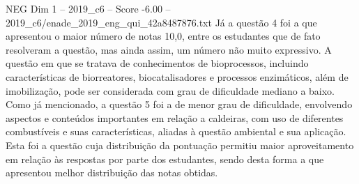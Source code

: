 \begin{textsample}{NEG Dim 1 – 2019\_c6 – Score -6.00 – 2019\_c6/enade\_2019\_eng\_qui\_42a8487876.txt}
Já a questão 4 foi a que apresentou o maior número de notas 10,0, entre os estudantes que de fato resolveram a questão, mas ainda assim, um número não muito expressivo.
A questão em que se tratava de conhecimentos de bioprocessos, incluindo características de biorreatores, biocatalisadores e processos enzimáticos, além de imobilização, pode ser considerada com grau de dificuldade mediano a baixo.
Como já mencionado, a questão 5 foi a de menor grau de dificuldade, envolvendo aspectos e conteúdos importantes em relação a caldeiras, com uso de diferentes combustíveis e suas características, aliadas à questão ambiental e sua aplicação.
Esta foi a questão cuja distribuição da pontuação permitiu maior aproveitamento em relação às respostas por parte dos estudantes, sendo desta forma a que apresentou melhor distribuição das notas obtidas.

\end{textsample}

